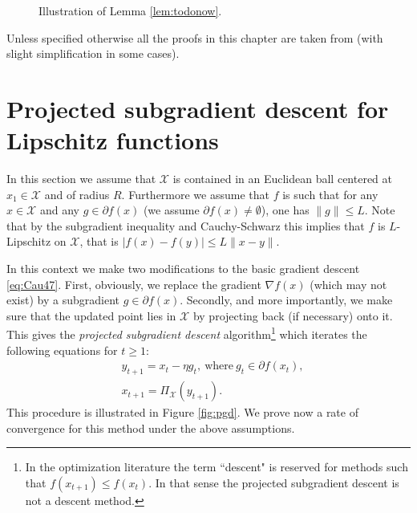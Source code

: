 \documentclass[openany]{now}
\newcommand{\cX}{\mathcal{X}}
\begin{document}
\begin{figure}
\begin{center}
\end{center}
\caption{Illustration of Lemma \ref{lem:todonow}.}
\label{fig:pythagore}
\end{figure}

Unless specified otherwise all the proofs in this chapter are taken from \cite{Nes04} (with slight simplification in some cases).

\section{Projected subgradient descent for Lipschitz functions} \label{sec:psgd}
In this section we assume that $\cX$ is contained in an Euclidean ball centered at $x_1 \in \cX$ and of radius $R$. Furthermore we assume that $f$ is such that for any $x \in \cX$ and any $g \in \partial f(x)$ (we assume $\partial f(x) \neq \emptyset$), one has $\|g\| \leq L$. Note that by the subgradient inequality and Cauchy-Schwarz this implies that $f$ is $L$-Lipschitz on $\cX$, that is $|f(x) - f(y)| \leq L \|x-y\|$. 

In this context we make two modifications to the basic gradient descent \eqref{eq:Cau47}. First, obviously, we replace the gradient $\nabla f(x)$ (which may not exist) by a subgradient $g \in \partial f(x)$. Secondly, and more importantly, we make sure that the updated point lies in $\cX$ by projecting back (if necessary) onto it. This gives the {\em projected subgradient descent} algorithm\footnote{In the optimization literature the term ``descent" is reserved for methods such that $f(x_{t+1}) \leq f(x_t)$. In that sense the projected subgradient descent is not a descent method.} which iterates the following equations for $t \geq 1$:
\begin{align}
& y_{t+1} = x_t - \eta g_t , \ \text{where} \ g_t \in \partial f(x_t) , \label{eq:PGD1}\\
& x_{t+1} = \Pi_{\cX}(y_{t+1}) . \label{eq:PGD2}
\end{align}
This procedure is illustrated in Figure \ref{fig:pgd}. We prove now a rate of convergence for this method under the above assumptions.
\end{document}
